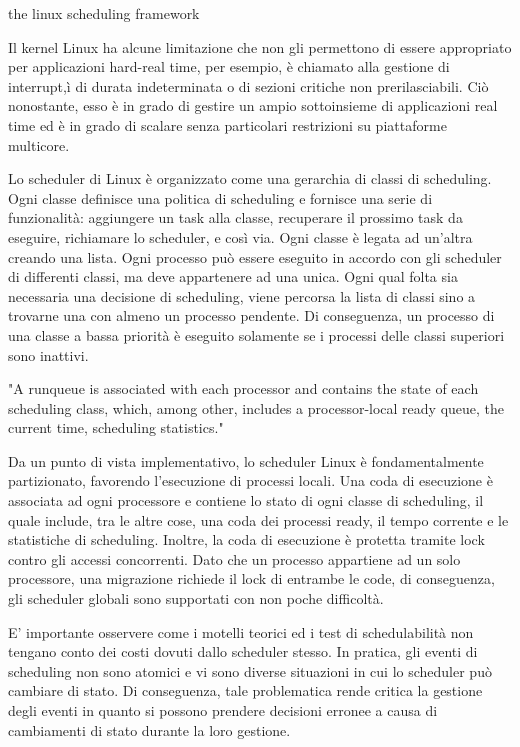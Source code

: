 the linux scheduling framework

Il kernel Linux ha alcune limitazione che non gli permettono di essere appropriato per applicazioni hard-real time, per esempio, è chiamato alla gestione di interrupt,ì di durata indeterminata o di sezioni critiche non prerilasciabili. Ciò nonostante, esso è in grado di gestire un ampio sottoinsieme di applicazioni real time ed è in grado di scalare senza particolari restrizioni su piattaforme multicore.

Lo scheduler di Linux è organizzato come una gerarchia di classi di scheduling. Ogni classe definisce una politica di scheduling e fornisce una serie di funzionalità: aggiungere un task alla classe, recuperare il prossimo task da eseguire, richiamare lo scheduler, e così via. Ogni classe è legata ad un'altra creando una lista. Ogni processo può essere eseguito in accordo con gli scheduler di differenti classi, ma deve appartenere ad una unica. Ogni qual folta sia necessaria una decisione di scheduling, viene percorsa la lista di classi sino a trovarne una con almeno un processo pendente. Di conseguenza, un processo di una classe a bassa priorità è eseguito solamente se i processi delle classi superiori sono inattivi.

"A runqueue is associated with each processor and contains
the state of each scheduling class, which, among other, includes
 a processor-local ready queue, the current time, scheduling statistics."

Da un punto di vista implementativo, lo scheduler Linux è fondamentalmente partizionato, favorendo l'esecuzione di processi locali. Una coda di esecuzione è associata ad ogni processore e contiene lo stato di ogni classe di scheduling, il quale include, tra le altre cose, una coda dei processi ready, il tempo corrente e le statistiche di scheduling. Inoltre, la coda di esecuzione è protetta tramite lock contro gli accessi concorrenti. Dato che un processo appartiene ad un solo processore, una migrazione richiede il lock di entrambe le code, di conseguenza, gli scheduler globali sono supportati con non poche difficoltà.

E' importante osservere come i motelli teorici ed i test di schedulabilità non tengano conto dei costi dovuti dallo scheduler stesso. In pratica, gli eventi di scheduling non sono atomici e vi sono diverse situazioni in cui lo scheduler può cambiare di stato. Di conseguenza, tale problematica rende critica la gestione degli eventi in quanto si possono prendere decisioni erronee a causa di cambiamenti di stato durante la loro gestione.

